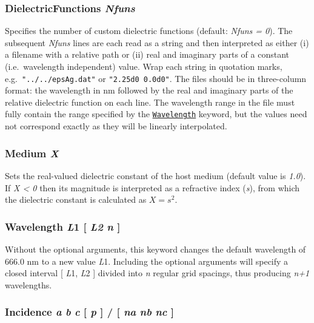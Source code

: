 \documentclass[
]{article}
\begin{document}
\hypertarget{dielectricfunctions-nfuns}{%
\subsubsection{\texorpdfstring{DielectricFunctions
\emph{Nfuns}}{DielectricFunctions Nfuns}}\label{dielectricfunctions-nfuns}}

Specifies the number of custom dielectric functions (default:
\emph{Nfuns = 0}). The subsequent \emph{Nfuns} lines are each read as a
string and then interpreted as either (i) a filename with a relative
path or (ii) real and imaginary parts of a constant (i.e.~wavelength
independent) value. Wrap each string in quotation marks,
e.g.~\texttt{"../../epsAg.dat"} or \texttt{"2.25d0\ 0.0d0"}. The files
should be in three-column format: the wavelength in nm followed by the
real and imaginary parts of the relative dielectric function on each
line. The wavelength range in the file must fully contain the range
specified by the
\protect\hyperlink{wavelength-l1-l2-n-}{\texttt{Wavelength}} keyword,
but the values need not correspond exactly as they will be linearly
interpolated.

\hypertarget{medium-x}{%
\subsubsection{\texorpdfstring{Medium
\emph{X}}{Medium X}}\label{medium-x}}

Sets the real-valued dielectric constant of the host medium (default
value is \emph{1.0}). If \emph{X \textless{} 0} then its magnitude is
interpreted as a refractive index (\emph{s}), from which the dielectric
constant is calculated as \(X=s^2\).

\hypertarget{wavelength-l1-l2-n}{%
\subsubsection{\texorpdfstring{Wavelength \emph{L}1 {[} \emph{L2}
\emph{n} {]}}{Wavelength L1 {[} L2 n {]}}}\label{wavelength-l1-l2-n}}

Without the optional arguments, this keyword changes the default
wavelength of 666.0 nm to a new value \emph{L}1. Including the optional
arguments will specify a closed interval {[} \emph{L}1, \emph{L}2 {]}
divided into \emph{n} regular grid spacings, thus producing \emph{n+1}
wavelengths.

\hypertarget{incidence-a-b-c-p-na-nb-nc}{%
\subsubsection{\texorpdfstring{Incidence \emph{a} \emph{b} \emph{c} {[}
\emph{p} {]} / {[} \emph{na} \emph{nb} \emph{nc}
{]}}{Incidence a b c {[} p {]} / {[} na nb nc {]}}}\label{incidence-a-b-c-p-na-nb-nc}}
\end{document}
